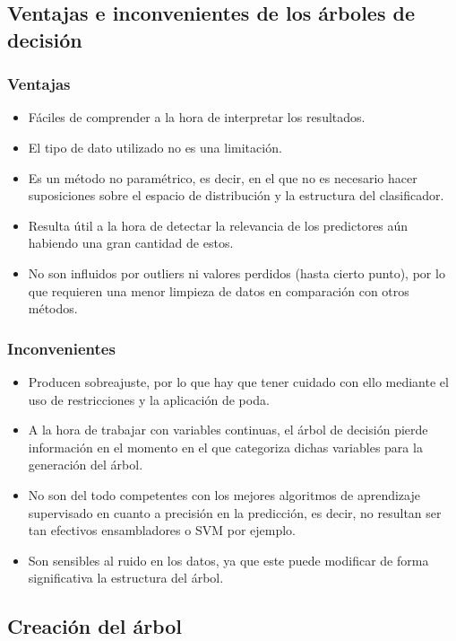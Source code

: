 \subsection{Ventajas e inconvenientes de los árboles de decisión}

\subsubsection{Ventajas}

\begin{itemize}
	\item Fáciles de comprender a la hora de interpretar los resultados.
	\item El tipo de dato utilizado no es una limitación.
	\item Es un método no paramétrico, es decir, en el que no es necesario hacer suposiciones sobre el espacio de distribución y la estructura del clasificador.
	\item Resulta útil a la hora de detectar la relevancia de los predictores aún habiendo una gran cantidad de estos.
	\item No son influidos por outliers ni valores perdidos (hasta cierto punto), por lo que requieren una menor limpieza de datos en comparación con otros métodos.
\end{itemize}

\subsubsection{Inconvenientes}

\begin{itemize}
	\item Producen sobreajuste, por lo que hay que tener cuidado con ello mediante el uso de restricciones y la aplicación de poda.
	\item A la hora de trabajar con variables continuas, el árbol de decisión pierde información en el momento en el que categoriza dichas variables para la generación del árbol.
	\item No son del todo competentes con los mejores algoritmos de aprendizaje supervisado en cuanto a precisión en la predicción, es decir, no resultan ser tan efectivos ensambladores o SVM por ejemplo.
	\item Son sensibles al ruido en los datos, ya que este puede modificar de forma significativa la estructura del árbol.
\end{itemize}

\subsection{Creación del árbol}

